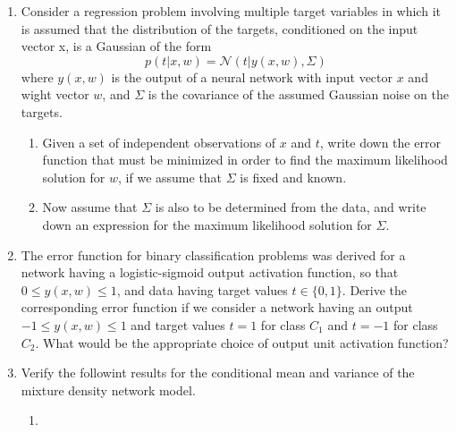 \documentclass[a4paper]{article}
\begin{document}
	\courseheader
	\begin{enumerate}
		\setlength{\itemsep}{3\parskip}
		\item
		Consider a regression problem involving multiple target variables in which it is assumed that the distribution of the targets, conditioned on the input vector x, is a Gaussian of the form
		\begin{equation*}
			p(t|x,w) = \mathcal{N}(t|y(x,w),\Sigma)
		\end{equation*}
		where $y(x,w)$ is the output of a neural network with input vector $x$ and wight vector $w$, and $\Sigma$ is the covariance of the assumed Gaussian noise on the targets.
		\begin{enumerate}
			\item
			Given a set of independent observations of $x$ and $t$, write down the error function that must be minimized in order to find the maximum likelihood solution for $w$, if we assume that $\Sigma$ is fixed and known.
			\item
			Now assume that $\Sigma$ is also to be determined from the data, and write down an expression for the maximum likelihood solution for $\Sigma$.
		\end{enumerate}
		\item
		The error function for binary classification problems was derived for a network having a logistic-sigmoid output activation function, so that $ 0\leq y(x,w) \leq 1$, and data having target values $t \in \{0,1\}$. Derive the corresponding error function if we consider a network having an output $-1 \leq y(x,w) \leq 1 $ and target values $t = 1$ for class $C_1$ and $t = -1 $ for class $C_2$. What would be the appropriate choice of output unit activation function?
		\item
		Verify the followint results for the conditional mean and variance of the mixture density network model.
		\begin{enumerate}
			\item
		\end{enumerate}
	\end{enumerate}
\end{document}
